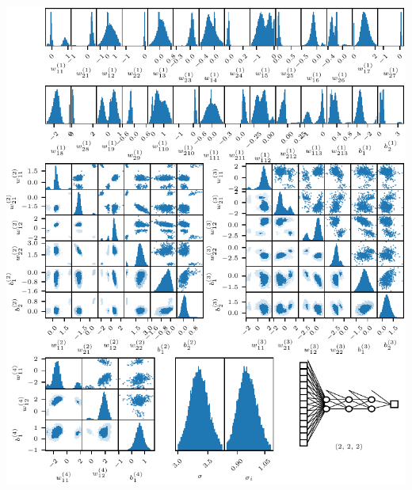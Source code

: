 \documentclass[aspectratio=169]{beamer}
\begin{document}
\begin{frame}
\begin{columns}
        \includegraphics[width=\textwidth]{figures/nn_posterior-cropped.pdf}
    \end{columns}
\end{frame}
\end{document}

